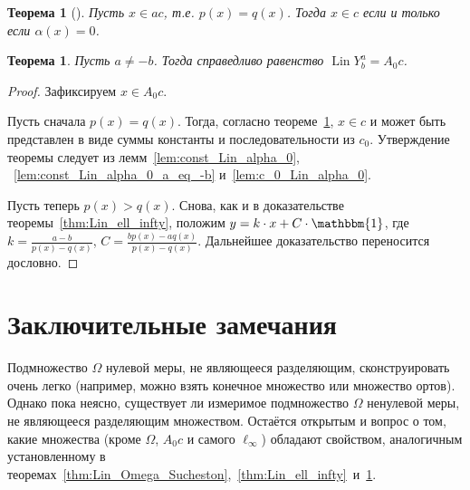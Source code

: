 \documentclass[a4paper,14pt]{article} %
\theoremstyle{plain}
\newtheorem{theorem}[lemma]{Теорема}
\begin{document}
\begin{theorem}[{\cite[следствие 2]{our-mz2019ac0}}]
	\label{thm:alpha_c_ac_c}
	Пусть $x\in ac$, т.е. $p(x) = q(x)$.
	Тогда $x\in c$ если и только если $\alpha(x) = 0$.
\end{theorem}

\begin{theorem}
	\label{thm:A_0_c_infty_lin}
	Пусть $a\neq -b$.
	Тогда справедливо равенство $\operatorname{Lin} Y^a_b = A_0 c$.
\end{theorem}

\begin{proof}
	Зафиксируем $x \in A_0 c$.

	Пусть сначала $p(x) = q(x)$.
	Тогда, согласно теореме~\ref{thm:alpha_c_ac_c}, $x\in c$
	и может быть представлен в виде суммы константы и последовательности из $c_0$.
	Утверждение теоремы следует из лемм~\ref{lem:const_Lin_alpha_0}, ~\ref{lem:const_Lin_alpha_0_a_eq_-b} и~\ref{lem:c_0_Lin_alpha_0}.

	Пусть теперь $p(x) > q(x)$.
	Снова, как и в доказательстве теоремы~\ref{thm:Lin_ell_infty},
	положим $y=k\cdot x + C\cdot\mathbbm{1}$,
	где $k=\frac{a-b}{p(x)-q(x)}$, $C=\frac{bp(x)-aq(x)}{p(x)-q(x)}$.
	Дальнейшее доказательство переносится дословно.
\end{proof}


\section{Заключительные замечания}
Подмножество $\Omega$ нулевой меры, не являющееся разделяющим, сконструировать очень легко
(например, можно взять конечное множество или множество ортов).
Однако пока неясно, существует ли измеримое подмножество $\Omega$ ненулевой меры,
не являющееся разделяющим множеством.
Остаётся открытым и вопрос о том, какие множества (кроме $\Omega$, $A_0 c$ и самого $\ell_\infty$)
обладают свойством, аналогичным установленному в теоремах~\ref{thm:Lin_Omega_Sucheston},~\ref{thm:Lin_ell_infty}~и~\ref{thm:A_0_c_infty_lin}.


\printbibliography
\end{document}
